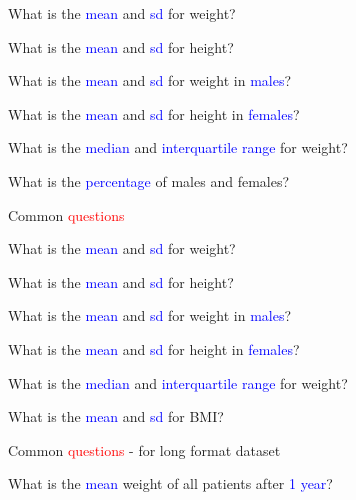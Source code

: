 \documentclass{presentatiesmetlogo}
\begin{document}
\newline
\bitemt
\item What is the \textcolor{blue}{mean} and \textcolor{blue}{sd} for weight?
\item What is the  \textcolor{blue}{mean} and \textcolor{blue}{sd} for height?
\item What is the \textcolor{blue}{mean} and \textcolor{blue}{sd} for weight in \textcolor{blue}{males}?
\item What is the \textcolor{blue}{mean} and \textcolor{blue}{sd} for height in \textcolor{blue}{females}?
\item What is the \textcolor{blue}{median} and \textcolor{blue}{interquartile range} for weight?
\item {}
\item What is the  \textcolor{blue}{percentage} of males and females?
\eitemt
\eitem
\bitem
\item Common \textcolor{red}{questions}
\newline
\bitemt
\item What is the \textcolor{blue}{mean} and \textcolor{blue}{sd} for weight?
\item What is the  \textcolor{blue}{mean} and \textcolor{blue}{sd} for height?
\item What is the \textcolor{blue}{mean} and \textcolor{blue}{sd} for weight in \textcolor{blue}{males}?
\item What is the \textcolor{blue}{mean} and \textcolor{blue}{sd} for height in \textcolor{blue}{females}?
\item What is the \textcolor{blue}{median} and \textcolor{blue}{interquartile range} for weight?
\item What is the \textcolor{blue}{mean} and \textcolor{blue}{sd} for BMI?
\item {}
\eitemt
\eitem
\bitem
\item Common \textcolor{red}{questions} - for long format dataset
\newline
\bitemt
\item {}
\item What is the \textcolor{blue}{mean} weight of all patients after \textcolor{blue}{1 year}?
\end{document}
